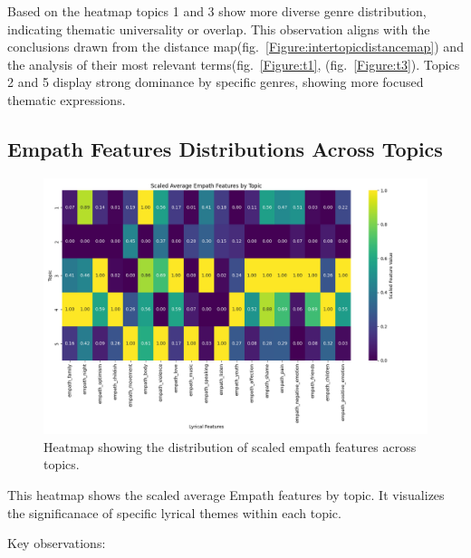 Based on the heatmap topics 1 and 3 show more diverse genre distribution,
indicating thematic universality or overlap. This observation aligns with the
conclusions drawn from the  distance
map(fig.~\ref{Figure:intertopicdistancemap}) and the analysis of their most
relevant terms(fig.~\ref{Figure:t1}, (fig.~\ref{Figure:t3}). Topics 2 and
5 display strong dominance by specific genres, showing more focused thematic
expressions.


\subsection{Empath Features Distributions Across Topics}

\begin{center}
\begin{figure}[H]
  \centering
  \includegraphics[width=5in]{img/lda_empath_features.png}
  \caption{Heatmap showing the distribution of scaled empath features across topics.}
  \label{Figure:fig_eh}
\end{figure}
\end{center}


This heatmap shows the scaled average Empath features by topic. It visualizes
the significanace of specific lyrical themes within each topic. 

\noindent \noindent Key observations:

